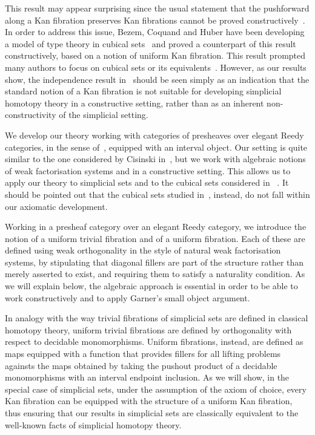 \documentclass[reqno,10pt,a4paper,oneside]{amsart}
\begin{document}
This result may appear surprising since the usual statement that the pushforward  along a Kan fibration 
preserves Kan fibrations cannot be proved constructively~\cite{coquand-non-constructivity-kan}. In 
order to address this issue, Bezem, Coquand and Huber have been developing a model of type theory
in cubical sets~\cite{coquand-cubical-sets,coquand-variation,huber-thesis} and proved a counterpart
of this result constructively, based on a notion of uniform Kan fibration. This result prompted many authors 
to focus on cubical sets or its equivalents~\cite{awodey-cubical,pitts-cubical-nominal,swan-awfs}.
However, as our results show, the independence result in~\cite{coquand-non-constructivity-kan}
should be seen  simply as an indication that the standard notion of a Kan 
fibration is not suitable for developing simplicial homotopy theory in a constructive setting, rather than 
as an inherent non-constructivity of the simplicial setting.

We develop our theory working with categories of presheaves over elegant Reedy categories,
in the sense of~\cite{bergner-rezk-elegant}, equipped with an interval object. Our setting is
quite similar to the one considered by Cisinski in~\cite{cisinski-univalence}, but we work
with algebraic notions of weak factorisation systems and in a constructive setting. This 
allows us to apply our theory to simplicial sets and to the cubical sets considered
in ~\cite{coquand-variation}. It should be pointed out that the cubical sets 
studied in~\cite{coquand-cubical-sets}, instead, do not fall within our axiomatic
development. 


 
Working in a presheaf category over an elegant Reedy category, 
we introduce the notion of a uniform trivial fibration and of a uniform fibration. 
Each of these are defined using weak orthogonality  in the style of
natural weak factorisation systems, \ie by stipulating that diagonal fillers are part of the
structure rather than merely asserted to exist, and requiring them to satisfy a naturality condition. 
As we will explain below, the algebraic approach is essential in order to be able to work
constructively and to apply Garner's small object argument. 

In analogy with the way trivial fibrations of simplicial sets are defined in classical homotopy theory,
uniform trivial fibrations are defined by orthogonality with respect to decidable monomorphisms. Uniform fibrations, instead, are defined as maps equipped with a function that provides fillers for all lifting  problems againsts the maps obtained by taking the pushout product of  a decidable monomorphisms with an interval endpoint inclusion. 
As we will show, in the special  case of simplicial sets, under the assumption of the axiom of choice,  
every Kan fibration can be equipped with the structure of a uniform Kan fibration, thus ensuring that our
results in simplicial sets are classically equivalent to the well-known facts of simplicial homotopy theory.
\end{document}
